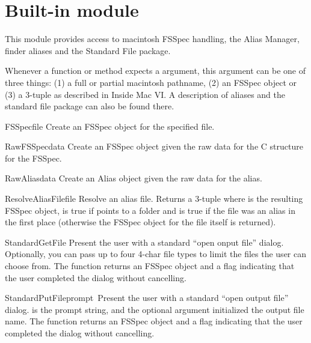 \section{Built-in module }

This module provides access to macintosh FSSpec handling, the Alias
Manager, finder aliases and the Standard File package.

Whenever a function or method expects a  argument, this
argument can be one of three things: (1) a full or partial macintosh
pathname, (2) an FSSpec object or (3) a 3-tuple  as described in Inside Mac VI. A description of aliases
and the standard file package can also be found there.

\begin{funcdesc}{FSSpec}{file}
Create an FSSpec object for the specified file.
\end{funcdesc}

\begin{funcdesc}{RawFSSpec}{data}
Create an FSSpec object given the raw data for the C structure for the
FSSpec.
\end{funcdesc}

\begin{funcdesc}{RawAlias}{data}
Create an Alias object given the raw data for the alias.
\end{funcdesc}

\begin{funcdesc}{ResolveAliasFile}{file}
Resolve an alias file. Returns a 3-tuple  where  is the resulting FSSpec object,
 is true if  points to a folder and
 is true if the file was an alias in the first place
(otherwise the FSSpec object for the file itself is returned).
\end{funcdesc}

\begin{funcdesc}{StandardGetFile}{}
Present the user with a standard ``open onput file''
dialog. Optionally, you can pass up to four 4-char file types to limit
the files the user can choose from. The function returns an FSSpec
object and a flag indicating that the user completed the dialog
without cancelling.
\end{funcdesc}

\begin{funcdesc}{StandardPutFile}{prompt\, }
Present the user with a standard ``open output file''
dialog.  is the prompt string, and the optional
 argument initialized the output file name. The function
returns an FSSpec object and a flag indicating that the user completed
the dialog without cancelling.
\end{funcdesc}

